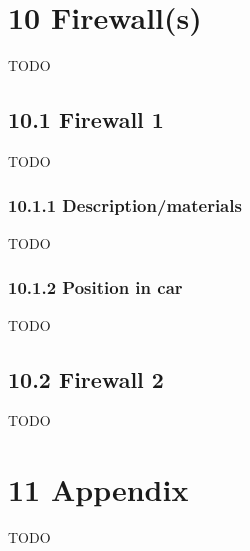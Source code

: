 \documentclass{article}
\begin{document}
\section*{10 Firewall(s)}
TODO

\subsection*{10.1 Firewall 1}
TODO

\subsubsection*{10.1.1 Description/materials}
TODO

\subsubsection*{10.1.2 Position in car}
TODO

\subsection*{10.2 Firewall 2}
TODO

\section*{11 Appendix}
TODO
\end{document}

